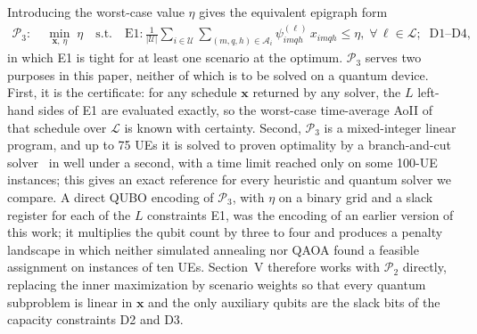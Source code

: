 Introducing the worst-case value $\eta$ gives the equivalent epigraph form
\begin{align}
    \mathscr{P}_{3}:\;&\min_{\mathbf{x},\,\eta}\;\eta
    \quad\text{s.t.}\quad
    \text{E1}:\frac{1}{|\mathscr{U}|}\sum_{i\in\mathscr{U}}\sum_{(m,q,h)\in\mathscr{A}_i}
    \psi_{imqh}^{(\ell)}\,x_{imqh}\leq\eta,\;\forall\,\ell\in\mathscr{L};\;\;\text{D1--D4},
    \nonumber
\end{align}
in which E1 is tight for at least one scenario at the optimum. $\mathscr{P}_{3}$ serves two purposes in this paper,
neither of which is to be solved on a quantum device. First, it is the certificate: for any schedule $\mathbf{x}$
returned by any solver, the $L$ left-hand sides of E1 are evaluated exactly, so the worst-case time-average AoII of
that schedule over $\mathscr{L}$ is known with certainty. Second, $\mathscr{P}_{3}$ is a mixed-integer linear program,
and up to 75 UEs it is solved to proven optimality by a branch-and-cut solver~\cite{HiGHS2018} in well under a
second, with a time limit reached only on some 100-UE instances; this gives an exact reference for every heuristic and
quantum solver we compare. A direct
QUBO encoding of $\mathscr{P}_{3}$, with $\eta$ on a binary grid and a slack register for each of the $L$
constraints E1, was the encoding of an earlier version of this work; it multiplies the qubit count by three to four
and produces a penalty landscape in which neither simulated annealing nor QAOA found a feasible assignment on
instances of ten UEs. Section~V therefore works with $\mathscr{P}_{2}$ directly, replacing the inner maximization by
scenario weights so that every quantum subproblem is linear in $\mathbf{x}$ and the only auxiliary qubits are the
slack bits of the capacity constraints D2 and D3.
